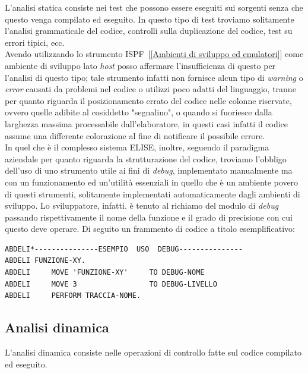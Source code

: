 L'analisi statica consiste nei test che possono essere eseguiti sui sorgenti senza che questo venga compilato ed eseguito. In questo tipo di test troviamo solitamente l'analisi grammaticale del codice, controlli sulla duplicazione del codice, test su errori tipici, ecc.\\

Avendo utilizzando lo strumento ISPF\glossario\ [\ref{Ambienti di sviluppo ed emulatori}] come ambiente di sviluppo lato \textit{host} posso affermare l'insufficienza di questo per l'analisi di questo tipo; tale strumento infatti non fornisce alcun tipo di \textit{warning} o \textit{error} causati da problemi nel codice o utilizzi poco adatti del linguaggio, tranne per quanto riguarda il posizionamento errato del codice nelle colonne riservate, ovvero quelle adibite al cosiddetto "segnalino", o quando si fuoriesce dalla larghezza massima processabile dall'elaboratore, in questi casi infatti il codice assume una differente colorazione al fine di notificare il possibile errore.\\

In quel che è il complesso sistema ELISE, inoltre, seguendo il paradigma aziendale per quanto riguarda la strutturazione del codice, troviamo l'obbligo dell'uso di uno strumento utile ai fini di \textit{debug}, implementato manualmente ma con un funzionamento ed un'utilità essenziali in quello che è un ambiente povero di questi strumenti, solitamente implementati automaticamente dagli ambienti di sviluppo. Lo sviluppatore, infatti. è tenuto al richiamo del modulo di \textit{debug} passando rispettivamente il nome della funzione e il grado di precisione con cui questo deve operare. Di seguito un frammento di codice a titolo esemplificativo:
	\begin{lstlisting}[language=cobol]
ABDELI*---------------ESEMPIO  USO  DEBUG---------------
ABDELI FUNZIONE-XY.
ABDELI     MOVE 'FUNZIONE-XY'     TO DEBUG-NOME
ABDELI     MOVE 3                 TO DEBUG-LIVELLO
ABDELI     PERFORM TRACCIA-NOME.
	\end{lstlisting}

\subsection{Analisi dinamica}
	
	L'analisi dinamica consiste nelle operazioni di controllo fatte sul codice compilato ed eseguito.\\

